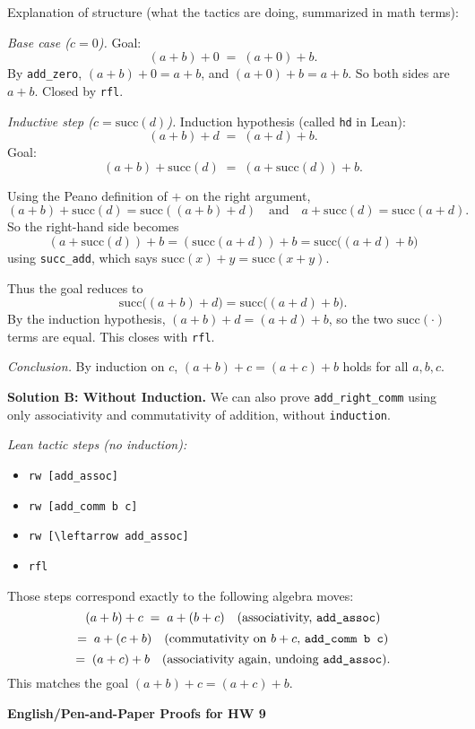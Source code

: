 \documentclass[11pt]{article}
\begin{document}
Explanation of structure (what the tactics are doing, summarized in math terms):

\emph{Base case ($c=0$).}  
Goal:
\[
(a+b)+0 \;=\; (a+0)+b.
\]
By \texttt{add\_zero}, $(a+b)+0 = a+b$, and $(a+0)+b = a+b$.  
So both sides are $a+b$. Closed by \texttt{rfl}.

\emph{Inductive step ($c = \mathrm{succ}(d)$).}  
Induction hypothesis (called \texttt{hd} in Lean):
\[
(a+b)+d \;=\; (a+d)+b.
\]
Goal:
\[
(a+b)+\mathrm{succ}(d) \;=\; (a+\mathrm{succ}(d))+b.
\]

Using the Peano definition of $+$ on the right argument,
\[
(a+b)+\mathrm{succ}(d) = \mathrm{succ}((a+b)+d)
\quad\text{and}\quad
a+\mathrm{succ}(d) = \mathrm{succ}(a+d).
\]
So the right-hand side becomes
\[
(a+\mathrm{succ}(d))+b
= (\mathrm{succ}(a+d))+b
= \mathrm{succ}\big((a+d)+b\big)
\]
using \texttt{succ\_add}, which says $\mathrm{succ}(x)+y=\mathrm{succ}(x+y)$.

Thus the goal reduces to
\[
\mathrm{succ}\big((a+b)+d\big)
=
\mathrm{succ}\big((a+d)+b\big).
\]
By the induction hypothesis, $(a+b)+d = (a+d)+b$, so the two $\mathrm{succ}(\cdot)$ terms are equal. This closes with \texttt{rfl}.

\emph{Conclusion.}  
By induction on $c$, $(a+b)+c = (a+c)+b$ holds for all $a,b,c$.

\bigskip
\noindent\textbf{Solution B: Without Induction.}  
We can also prove \texttt{add\_right\_comm} using only associativity and commutativity of addition, without \texttt{induction}.

\emph{Lean tactic steps (no induction):}
\begin{itemize}[leftmargin=1.4em]
  \item \texttt{rw [add\_assoc]}
  \item \texttt{rw [add\_comm b c]}
  \item \texttt{rw [\textbackslash leftarrow{} add\_assoc]}
  \item \texttt{rfl}
\end{itemize}

Those steps correspond exactly to the following algebra moves:
\[
(a+b)+c
\;=\;
a+(b+c)
\quad\text{(associativity, \texttt{add\_assoc})}
\]
\[
=\;
a+(c+b)
\quad\text{(commutativity on $b+c$, \texttt{add\_comm b c})}
\]
\[
=\;
(a+c)+b
\quad\text{(associativity again, undoing \texttt{add\_assoc})}.
\]
This matches the goal $(a+b)+c = (a+c)+b$.

\bigskip
\noindent\textbf{English/Pen-and-Paper Proofs for HW 9}
\end{document}
